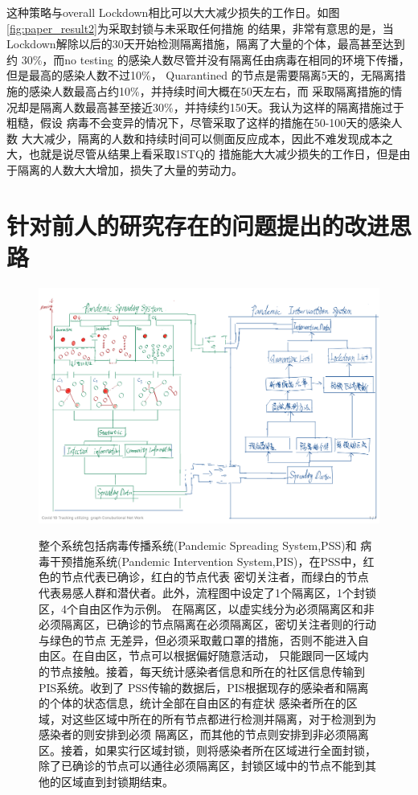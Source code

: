                 这种策略与overall Lockdown相比可以大大减少损失的工作日。如图\ref{fig:paper_result2}为采取封锁与未采取任何措施
                的结果，非常有意思的是，当Lockdown解除以后的30天开始检测隔离措施，隔离了大量的个体，最高甚至达到约
                30\%，而no testing 的感染人数尽管并没有隔离任由病毒在相同的环境下传播，但是最高的感染人数不过10\%，
                Quarantined 的节点是需要隔离5天的，无隔离措施的感染人数最高占约10\%，并持续时间大概在50天左右，而
                采取隔离措施的情况却是隔离人数最高甚至接近30\%，并持续约150天。我认为这样的隔离措施过于粗糙，假设
                病毒不会变异的情况下，尽管采取了这样的措施在50-100天的感染人数
                大大减少，隔离的人数和持续时间可以侧面反应成本，因此不难发现成本之大，也就是说尽管从结果上看采取1STQ的
                措施能大大减少损失的工作日，但是由于隔离的人数大大增加，损失了大量的劳动力。
        \section{针对前人的研究存在的问题提出的改进思路}
            \begin{figure}[htbp]
            \centering
            \includegraphics[scale = 0.40]{./img/workflow.pdf}
            \label{fig:workflow simulation}
            \caption{整个系统包括病毒传播系统(Pandemic Spreading System,PSS)和
            病毒干预措施系统(Pandemic Intervention System,PIS)，在PSS中，红色的节点代表已确诊，红白的节点代表
            密切关注者，而绿白的节点代表易感人群和潜伏者。此外，流程图中设定了1个隔离区，1个封锁区，4个自由区作为示例。
            在隔离区，以虚实线分为必须隔离区和非必须隔离区，已确诊的节点隔离在必须隔离区，密切关注者则的行动与绿色的节点
            无差异，但必须采取戴口罩的措施，否则不能进入自由区。在自由区，节点可以根据偏好随意活动，
            只能跟同一区域内的节点接触。接着，每天统计感染者信息和所在的社区信息传输到PIS系统。收到了
            PSS传输的数据后，PIS根据现存的感染者和隔离的个体的状态信息，统计全部在自由区的有症状
            感染者所在的区域，对这些区域中所在的所有节点都进行检测并隔离，对于检测到为感染者的则安排到必须
            隔离区，而其他的节点则安排到非必须隔离区。接着，如果实行区域封锁，则将感染者所在区域进行全面封锁，
            除了已确诊的节点可以通往必须隔离区，封锁区域中的节点不能到其他的区域直到封锁期结束。}
        \end{figure}
